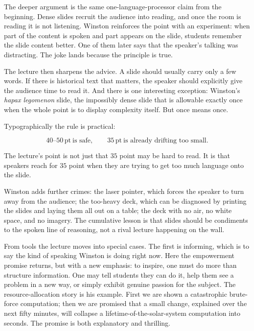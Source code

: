 The deeper argument is the same one-language-processor claim from the beginning. Dense slides recruit the audience into reading, and once the room is reading it is not listening. Winston reinforces the point with an experiment: when part of the content is spoken and part appears on the slide, students remember the slide content better. One of them later says that the speaker's talking was distracting. The joke lands because the principle is true.

The lecture then sharpens the advice. A slide should usually carry only a few words. If there is historical text that matters, the speaker should explicitly give the audience time to read it. And there is one interesting exception: Winston's \emph{hapax legomenon} slide, the impossibly dense slide that is allowable exactly once when the whole point is to display complexity itself. But once means once.

Typographically the rule is practical:

\begin{equation}
40\text{--}50\,\mathrm{pt}\ \text{is safe}, \qquad 35\,\mathrm{pt}\ \text{is already drifting too small.}
\end{equation}

The lecture's point is not just that \(35\) point may be hard to read. It is that speakers reach for \(35\) point when they are trying to get too much language onto the slide.

Winston adds further crimes: the laser pointer, which forces the speaker to turn away from the audience; the too-heavy deck, which can be diagnosed by printing the slides and laying them all out on a table; the deck with no air, no white space, and no imagery. The cumulative lesson is that slides should be condiments to the spoken line of reasoning, not a rival lecture happening on the wall.

From tools the lecture moves into special cases. The first is informing, which is to say the kind of speaking Winston is doing right now. Here the empowerment promise returns, but with a new emphasis: to inspire, one must do more than structure information. One may tell students they can do it, help them see a problem in a new way, or simply exhibit genuine passion for the subject. The resource-allocation story is his example. First we are shown a catastrophic brute-force computation; then we are promised that a small change, explained over the next fifty minutes, will collapse a lifetime-of-the-solar-system computation into seconds. The promise is both explanatory and thrilling.

